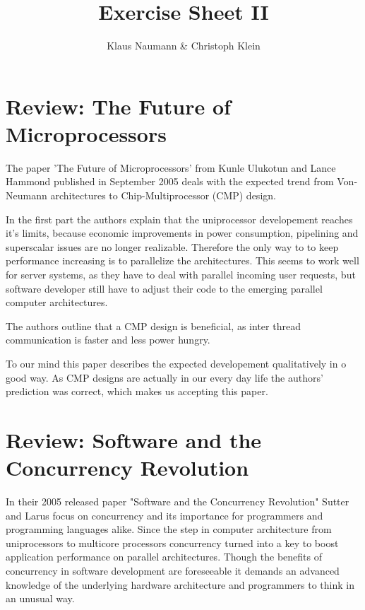 \documentclass[DIV=12,oneside,a4paper]{scrartcl}
\begin{document}

\title{Exercise Sheet II}
\subject{Advanced Parallel Computing}
\author{Klaus Naumann \& Christoph Klein}
\maketitle




\section{Review: The Future of Microprocessors}
The paper 'The Future of Microprocessors' from Kunle Ulukotun and Lance Hammond published
in September 2005 deals with the expected trend from Von-Neumann architectures to
Chip-Multiprocessor (CMP) design.

 In the first part the authors explain that the
uniprocessor developement reaches it's limits, because economic improvements
in power consumption, pipelining and superscalar issues are no longer realizable.
Therefore the only way to to keep performance increasing is to parallelize
the architectures. This seems to work well for server systems, as they have
to deal with parallel incoming user requests, but software developer still have to
adjust their code to the emerging parallel computer architectures.

The authors outline that a CMP design is beneficial, as inter thread communication
is faster and less power hungry. 

To our mind this paper describes the expected developement qualitatively in o good way.
As CMP designs are actually in our every day life the authors' prediction was correct,
which makes us accepting this paper.

\section{Review: Software and the Concurrency Revolution}
In their 2005 released paper "Software and the Concurrency Revolution" Sutter 
and Larus focus on concurrency and its importance for programmers and 
programming languages alike. Since the step in computer architecture from 
uniprocessors to multicore processors concurrency turned into a key to boost 
application performance on parallel architectures. Though the benefits of 
concurrency in software development are foreseeable it demands an advanced 
knowledge of the underlying hardware architecture and programmers to think in 
an unusual way.
\end{document}
